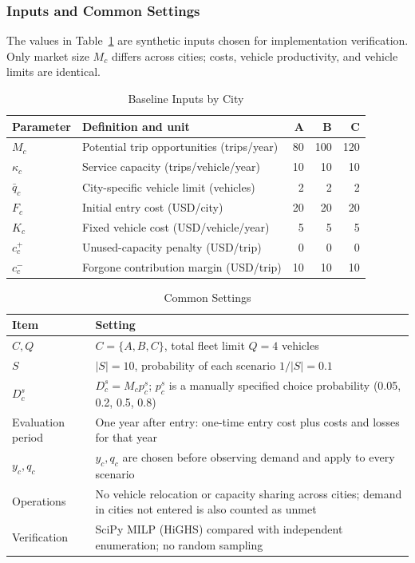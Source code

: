 \documentclass[10pt,a4paper]{article}
\begin{document}
\subsubsection{Inputs and Common Settings}
The values in Table~\ref{tab:sc-input} are synthetic inputs chosen for implementation verification. Only market size $M_c$ differs across cities; costs, vehicle productivity, and vehicle limits are identical.
\begin{table}[H]
\centering\small
\caption{Baseline Inputs by City}\label{tab:sc-input}
\begin{tabular}{llrrr}
\toprule
Parameter & Definition and unit & A & B & C\\\midrule
$M_c$ & Potential trip opportunities (trips/year) & 80 & 100 & 120\\
$\kappa_c$ & Service capacity (trips/vehicle/year) & 10 & 10 & 10\\
$\bar q_c$ & City-specific vehicle limit (vehicles) & 2 & 2 & 2\\
$F_c$ & Initial entry cost (USD/city) & 20 & 20 & 20\\
$K_c$ & Fixed vehicle cost (USD/vehicle/year) & 5 & 5 & 5\\
$c_c^+$ & Unused-capacity penalty (USD/trip) & 0 & 0 & 0\\
$c_c^-$ & Forgone contribution margin (USD/trip) & 10 & 10 & 10\\
\bottomrule
\end{tabular}
\end{table}
\begin{table}[H]
\centering\small
\caption{Common Settings}\label{tab:sc-common}
\begin{tabular}{P{.19\linewidth}P{.72\linewidth}}
\toprule
Item & Setting\\\midrule
$C,Q$ & $C=\{A,B,C\}$, total fleet limit $Q=4$ vehicles\\
$S$ & $|S|=10$, probability of each scenario $1/|S|=0.1$\\
$D_c^s$ & $D_c^s=M_cp_c^s$; $p_c^s$ is a manually specified choice probability (0.05, 0.2, 0.5, 0.8)\\
Evaluation period & One year after entry: one-time entry cost plus costs and losses for that year\\
$y_c,q_c$ & $y_c,q_c$ are chosen before observing demand and apply to every scenario\\
Operations & No vehicle relocation or capacity sharing across cities; demand in cities not entered is also counted as unmet\\
Verification & SciPy MILP (HiGHS) compared with independent enumeration; no random sampling\\
\bottomrule
\end{tabular}
\end{table}
\end{document}
